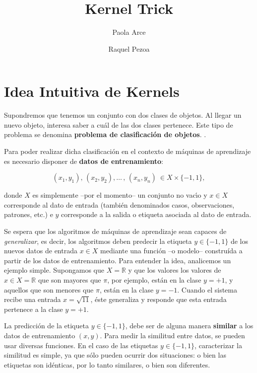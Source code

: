 \documentclass[12pt,reqno]{amsart}
\title{Kernel Trick}
\author{Paola Arce \and Raquel Pezoa}
\begin{document}
\maketitle

\section{Idea Intuitiva de Kernels}
Supondremos que tenemos un conjunto con dos clases de objetos.
Al llegar un nuevo objeto, interesa saber a cu\'al de
las dos clases pertenece.
Este tipo de problema se denomina
{\bf problema de clasificaci\'on de objetos}. \cite{smola}.

Para poder realizar dicha clasificaci\'on en el contexto de m\'aquinas de
aprendizaje es necesario disponer de {\bf datos de entrenamiento}:

$$
(x_1,y_1),\,(x_2,y_2),\dots\,,\,(x_n,y_n)\ \in X\times\{-1,1\},
$$

\noindent donde $X$ es simplemente --por el momento-- un conjunto no vac\'\i o
y $x\in X$ corresponde al dato de entrada (tambi\'en denominados casos,
observaciones, patrones, etc.) e $y$ corresponde a la salida o etiqueta
asociada al dato de entrada.


Se espera que los algoritmos de m\'aquinas de  aprendizaje sean capaces de \emph{generalizar}, es decir,
los algoritmos deben predecir la etiqueta $y \in \{-1,1\}$
de los nuevos datos de entrada $x \in X$  mediante una funci\'on --o modelo-- constru\'ida
a partir de los datos de entrenamiento.
Para entender la idea, analicemos un ejemplo simple.
Supongamos que $X=\mathbb{R}$  y que los valores los valores de $x\in X=\mathbb{R}$ que son
mayores que $\pi$, por ejemplo, est\'an en la clase $y=+1$, y aquellos que son menores que $\pi$, est\'an en la clase $y=-1$.
Cuando el sistema recibe una entrada $x=\sqrt{11}$, \'este generaliza y responde que esta entrada pertenece a la clase $y=+1$.


La predicci\'on de la etiqueta $y\in\{-1,1\}$, debe ser de alguna manera
\textbf{similar} a los datos de entrenamiento $(x,y)$.
%
Para medir la similitud entre datos, se pueden usar diversas funciones.
En el caso de las etiquetas $y\in\{-1,1\}$, caracterizar la similitud es
simple, ya que s\'olo pueden ocurrir dos situaciones:
o bien las etiquetas son id\'enticas, por lo tanto similares,  o  bien son diferentes.
\end{document}
